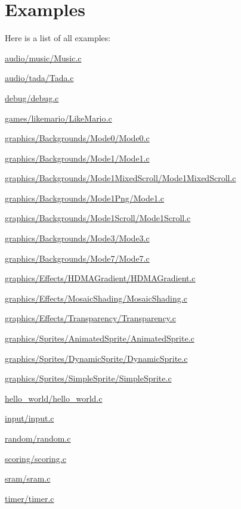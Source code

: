 \section{Examples}
Here is a list of all examples\+:\begin{DoxyCompactItemize}
\item 
\hyperlink{a00422}{audio/music/\+Music.\+c}
\item 
\hyperlink{a00424}{audio/tada/\+Tada.\+c}
\item 
\hyperlink{a00426}{debug/debug.\+c}
\item 
\hyperlink{a00420}{games/likemario/\+Like\+Mario.\+c}
\item 
\hyperlink{a00390}{graphics/\+Backgrounds/\+Mode0/\+Mode0.\+c}
\item 
\hyperlink{a00392}{graphics/\+Backgrounds/\+Mode1/\+Mode1.\+c}
\item 
\hyperlink{a00398}{graphics/\+Backgrounds/\+Mode1\+Mixed\+Scroll/\+Mode1\+Mixed\+Scroll.\+c}
\item 
\hyperlink{a00394}{graphics/\+Backgrounds/\+Mode1\+Png/\+Mode1.\+c}
\item 
\hyperlink{a00396}{graphics/\+Backgrounds/\+Mode1\+Scroll/\+Mode1\+Scroll.\+c}
\item 
\hyperlink{a00400}{graphics/\+Backgrounds/\+Mode3/\+Mode3.\+c}
\item 
\hyperlink{a00402}{graphics/\+Backgrounds/\+Mode7/\+Mode7.\+c}
\item 
\hyperlink{a00404}{graphics/\+Effects/\+H\+D\+M\+A\+Gradient/\+H\+D\+M\+A\+Gradient.\+c}
\item 
\hyperlink{a00406}{graphics/\+Effects/\+Mosaic\+Shading/\+Mosaic\+Shading.\+c}
\item 
\hyperlink{a00408}{graphics/\+Effects/\+Transparency/\+Transparency.\+c}
\item 
\hyperlink{a00412}{graphics/\+Sprites/\+Animated\+Sprite/\+Animated\+Sprite.\+c}
\item 
\hyperlink{a00414}{graphics/\+Sprites/\+Dynamic\+Sprite/\+Dynamic\+Sprite.\+c}
\item 
\hyperlink{a00410}{graphics/\+Sprites/\+Simple\+Sprite/\+Simple\+Sprite.\+c}
\item 
\hyperlink{a00388}{hello\+\_\+world/hello\+\_\+world.\+c}
\item 
\hyperlink{a00416}{input/input.\+c}
\item 
\hyperlink{a00428}{random/random.\+c}
\item 
\hyperlink{a00432}{scoring/scoring.\+c}
\item 
\hyperlink{a00430}{sram/sram.\+c}
\item 
\hyperlink{a00418}{timer/timer.\+c}
\end{DoxyCompactItemize}
